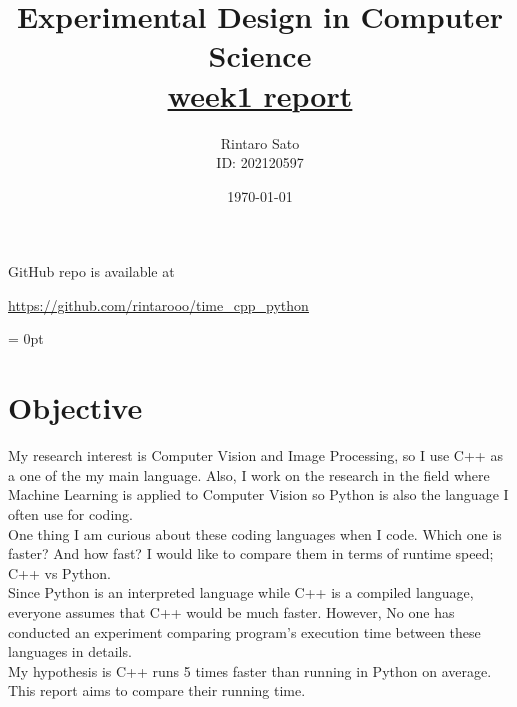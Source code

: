 \documentclass[11pt, a4paper]{article}
\title{Experimental Design in Computer  Science \\ \href{https://manaba.tsukuba.ac.jp/ct/course_1910418_report_1960312}{\underline{week1 report}}}
\author{Rintaro Sato \\ ID: 202120597}
\date{\today}
\begin{document}
\maketitle


\centerline{GitHub repo is available at}
\centerline{\underline{\url{https://github.com/rintarooo/time_cpp_python}}}

\noindent
\parindent = 0pt

\section{Objective}
My research interest is Computer Vision and Image Processing, so I use C++ as a one of the my main language. Also, I work on the research in the field where Machine Learning is applied to Computer Vision so Python is also the language I often use for coding.\\

One thing I am curious about these coding languages when I code. Which one is faster? And how fast? I would like to compare them in terms of runtime speed; C++ vs Python.\\

Since Python is an interpreted language while C++ is a compiled language, everyone assumes that C++ would be much faster. However, No one has conducted an experiment comparing program's execution time between these languages in details.\\

My hypothesis is C++ runs 5 times faster than running in Python on average. This report aims to compare their running time.

\end{document}
